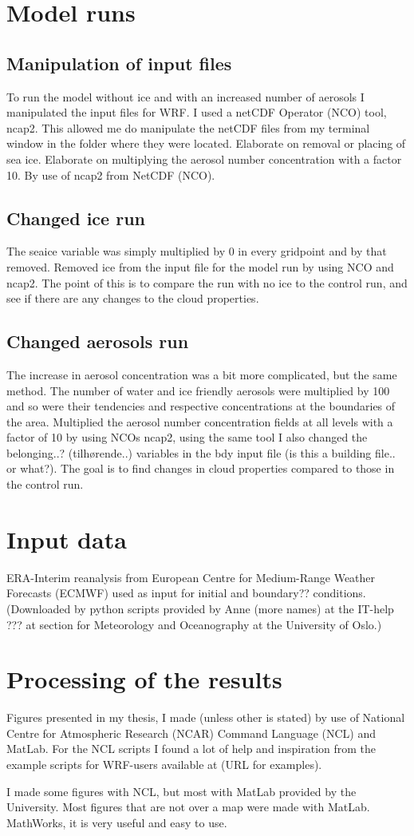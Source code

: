 \section{Model runs}
\subsection{Manipulation of input files}
To run the model without ice and with an increased number of aerosols I manipulated the input files for WRF. I used a netCDF Operator (NCO) tool, ncap2. This allowed me do manipulate the netCDF files from my terminal window in the folder where they were located.
Elaborate on removal or placing of sea ice. Elaborate on multiplying the aerosol number concentration with a factor 10. By use of ncap2 from NetCDF (NCO).

\subsection{Changed ice run}
The seaice variable was simply multiplied by 0 in every gridpoint and by that removed.
Removed ice from the input file for the model run by using NCO and ncap2. The point of this is to compare the run with no ice to the control run, and see if there are any changes to the cloud properties.

\subsection{Changed aerosols run}
The increase in aerosol concentration was a bit more complicated, but the same method. The number of water and ice friendly aerosols were multiplied by 100 and so were their tendencies and respective concentrations at the boundaries of the area.
Multiplied the aerosol number concentration fields at all levels with a factor of 10 by using NCOs ncap2, using the same tool I also changed the belonging..? (tilhørende..) variables in the bdy input file (is this a building file.. or what?). The goal is to find changes in cloud properties compared to those in the control run.

\section{Input data}
ERA-Interim reanalysis from European Centre for Medium-Range Weather Forecasts (ECMWF) used as input for initial and boundary?? conditions. (Downloaded by python scripts provided by Anne (more names) at the IT-help ??? at section for Meteorology and Oceanography at the University of Oslo.)

\section{Processing of the results}
Figures presented in my thesis, I made (unless other is stated) by use of National Centre for Atmospheric Research (NCAR) Command Language (NCL) and MatLab. For the NCL scripts I found a lot of help and inspiration from the example scripts for WRF-users available at (URL for examples).

I made some figures with NCL, but most with MatLab provided by the University. Most figures that are not over a map were made with MatLab. MathWorks, it is very useful and easy to use.